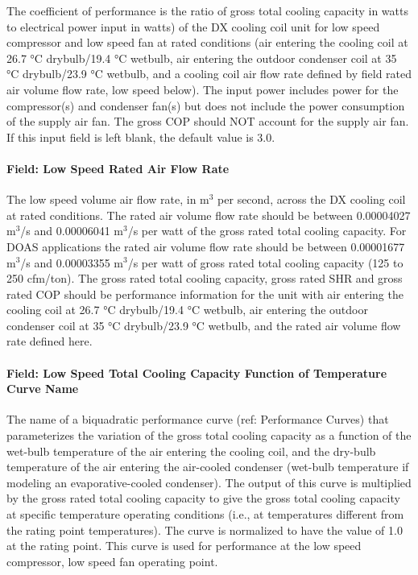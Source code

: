 The coefficient of performance is the ratio of gross total cooling capacity in watts to electrical power input in watts) of the DX cooling coil unit for low speed compressor and low speed fan at rated conditions (air entering the cooling coil at 26.7 °C drybulb/19.4 °C wetbulb, air entering the outdoor condenser coil at 35 °C drybulb/23.9 °C wetbulb, and a cooling coil air flow rate defined by field rated air volume flow rate, low speed below). The input power includes power for the compressor(s) and condenser fan(s) but does not include the power consumption of the supply air fan. The gross COP should NOT account for the supply air fan. If this input field is left blank, the default value is 3.0.

\paragraph{Field: Low Speed Rated Air Flow Rate}\label{field-low-speed-rated-air-flow-rate}

The low speed volume air flow rate, in m\(^{3}\) per second, across the DX cooling coil at rated conditions. The rated air volume flow rate should be between 0.00004027 m\(^{3}\)/s and 0.00006041 m\(^{3}\)/s per watt of the gross rated total cooling capacity. For DOAS applications the rated air volume flow rate should be between 0.00001677 m\(^{3}\)/s and 0.00003355 m\(^{3}\)/s per watt of gross rated total cooling capacity (125 to 250 cfm/ton). The gross rated total cooling capacity, gross rated SHR and gross rated COP should be performance information for the unit with air entering the cooling coil at 26.7 °C drybulb/19.4 °C wetbulb, air entering the outdoor condenser coil at 35 °C drybulb/23.9 °C wetbulb, and the rated air volume flow rate defined here.

\paragraph{Field: Low Speed Total Cooling Capacity Function of Temperature Curve Name}\label{field-low-speed-total-cooling-capacity-function-of-temperature-curve-name}

The name of a biquadratic performance curve (ref: Performance Curves) that parameterizes the variation of the gross total cooling capacity as a function of the wet-bulb temperature of the air entering the cooling coil, and the dry-bulb temperature of the air entering the air-cooled condenser (wet-bulb temperature if modeling an evaporative-cooled condenser). The output of this curve is multiplied by the gross rated total cooling capacity to give the gross total cooling capacity at specific temperature operating conditions (i.e., at temperatures different from the rating point temperatures). The curve is normalized to have the value of 1.0 at the rating point. This curve is used for performance at the low speed compressor, low speed fan operating point.

